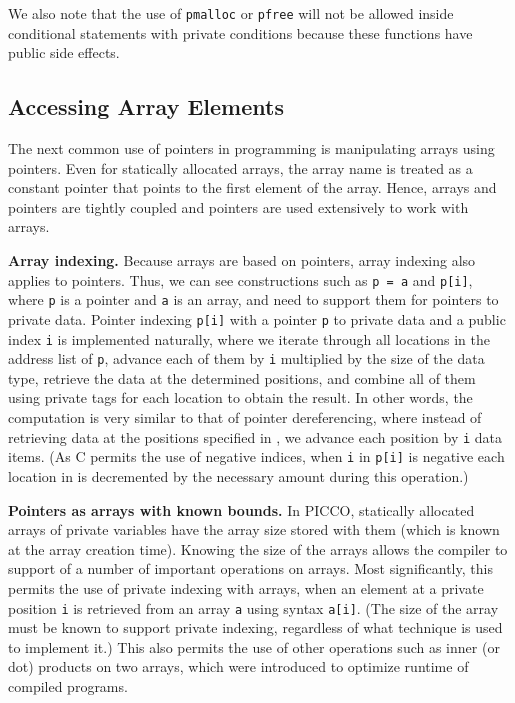 \documentclass[11pt]{article}
\begin{document}
We also note that the use of \texttt{pmalloc} or \texttt{pfree} will not be
allowed inside conditional statements with private conditions because these
functions have public side effects.

\subsection{Accessing Array Elements}

The next common use of pointers in programming is manipulating arrays using
pointers. Even for statically allocated arrays, the array name is treated as
a constant pointer that points to the first element of the array. Hence,
arrays and pointers are tightly coupled and pointers are used extensively to
work with arrays.

\medskip \noindent \textbf{Array indexing.} Because arrays are based on
pointers, array indexing also applies to pointers. Thus, we can see
constructions such as \texttt{p = a} and \texttt{p[i]}, where \texttt{p} is
a pointer and \texttt{a} is an array, and need to support them for pointers
to private data. Pointer indexing \texttt{p[i]} with a pointer \texttt{p} to
private data and a public index \texttt{i} is implemented naturally, where
we iterate through all locations in the address list  of \texttt{p},
advance each of them by \texttt{i} multiplied by the size of the data type,
retrieve the data at the determined positions, and combine all of them using
private tags for each location to obtain the result. In other words, the
computation is very similar to that of pointer dereferencing, where instead
of retrieving data at the positions specified in , we advance each
position by \texttt{i} data items. (As C permits the use of negative
indices, when \texttt{i} in \texttt{p[i]} is negative each location in 
is decremented by the necessary amount during this operation.)

\medskip \noindent \textbf{Pointers as arrays with known bounds.} In PICCO,
statically allocated arrays of private variables have the array size stored
with them (which is known at the array creation time). Knowing the size of
the arrays allows the compiler to support of a number of important
operations on arrays. Most significantly, this permits the use of private
indexing with arrays, when an element at a private position \texttt{i} is
retrieved from an array \texttt{a} using syntax \texttt{a[i]}. (The size of
the array must be known to support private indexing, regardless of what
technique is used to implement it.) This also permits the use of other
operations such as inner (or dot) products on two arrays, which were
introduced to optimize runtime of compiled programs.
\end{document}
